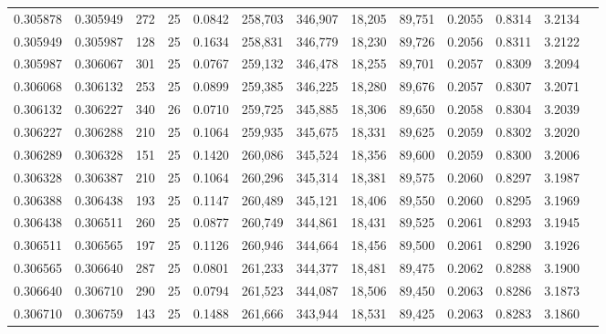 \begin{tabular}{rrrrrrrrrrrrr}
0.305878 & 0.305949 &   272 &  25 &                                     0.0842 & 258,703 & 346,907 &  18,205 &  89,751 & 0.2055 & 0.8314 & 3.2134 \\
0.305949 & 0.305987 &   128 &  25 &                                     0.1634 & 258,831 & 346,779 &  18,230 &  89,726 & 0.2056 & 0.8311 & 3.2122 \\
0.305987 & 0.306067 &   301 &  25 &                                     0.0767 & 259,132 & 346,478 &  18,255 &  89,701 & 0.2057 & 0.8309 & 3.2094 \\
0.306068 & 0.306132 &   253 &  25 &                                     0.0899 & 259,385 & 346,225 &  18,280 &  89,676 & 0.2057 & 0.8307 & 3.2071 \\
0.306132 & 0.306227 &   340 &  26 &                                     0.0710 & 259,725 & 345,885 &  18,306 &  89,650 & 0.2058 & 0.8304 & 3.2039 \\
0.306227 & 0.306288 &   210 &  25 &                                     0.1064 & 259,935 & 345,675 &  18,331 &  89,625 & 0.2059 & 0.8302 & 3.2020 \\
0.306289 & 0.306328 &   151 &  25 &                                     0.1420 & 260,086 & 345,524 &  18,356 &  89,600 & 0.2059 & 0.8300 & 3.2006 \\
0.306328 & 0.306387 &   210 &  25 &                                     0.1064 & 260,296 & 345,314 &  18,381 &  89,575 & 0.2060 & 0.8297 & 3.1987 \\
0.306388 & 0.306438 &   193 &  25 &                                     0.1147 & 260,489 & 345,121 &  18,406 &  89,550 & 0.2060 & 0.8295 & 3.1969 \\
0.306438 & 0.306511 &   260 &  25 &                                     0.0877 & 260,749 & 344,861 &  18,431 &  89,525 & 0.2061 & 0.8293 & 3.1945 \\
0.306511 & 0.306565 &   197 &  25 &                                     0.1126 & 260,946 & 344,664 &  18,456 &  89,500 & 0.2061 & 0.8290 & 3.1926 \\
0.306565 & 0.306640 &   287 &  25 &                                     0.0801 & 261,233 & 344,377 &  18,481 &  89,475 & 0.2062 & 0.8288 & 3.1900 \\
0.306640 & 0.306710 &   290 &  25 &                                     0.0794 & 261,523 & 344,087 &  18,506 &  89,450 & 0.2063 & 0.8286 & 3.1873 \\
0.306710 & 0.306759 &   143 &  25 &                                     0.1488 & 261,666 & 343,944 &  18,531 &  89,425 & 0.2063 & 0.8283 & 3.1860 \\

\end{tabular}

